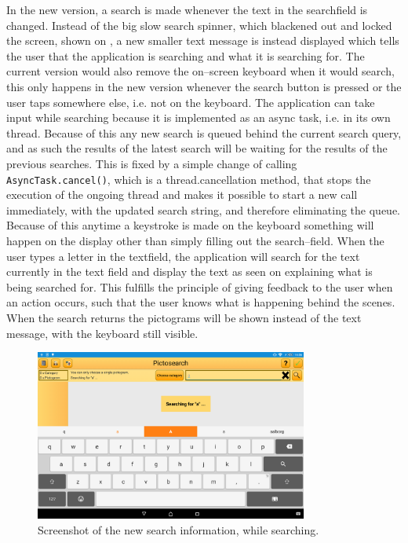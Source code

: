 In the new version, a search is made whenever the text in the searchfield is changed.
Instead of the big slow search spinner, which blackened out and locked the screen, shown on , a new smaller text message is instead displayed which tells the user that the application is searching and what it is searching for.
The current version would also remove the on--screen keyboard when it would search, this only happens in the new version whenever the search button is pressed or the user taps somewhere else, i.e. not on the keyboard.
The application can take input while searching because it is implemented as an async task, i.e. in its own thread.
Because of this any new search is queued behind the current search query, and as such the results of the latest search will be waiting for the results of the previous searches.
This is fixed by a simple change of calling \texttt{AsyncTask.cancel()}, which is a thread.cancellation method, that stops the execution of the ongoing thread and makes it possible to start a new call immediately, with the updated search string, and therefore eliminating the queue.
Because of this anytime a keystroke is made on the keyboard something will happen on the display other than simply filling out the search--field.
When the user types a letter in the textfield, the application will search for the text currently in the text field and display the text as seen on  explaining what is being searched for.
This fulfills the principle of giving feedback to the user when an action occurs, such that the user knows what is happening behind the scenes.
When the search returns the pictograms will be shown instead of the text message, with the keyboard still visible.

\begin{figure}[ht]
    \centering
    \includegraphics[width=0.8\textwidth]{figures/img/screenshots/new_dialog.png}
    \caption{Screenshot of the new search information, while searching.}\label{fig:screenshot_newsearch}
\end{figure}

